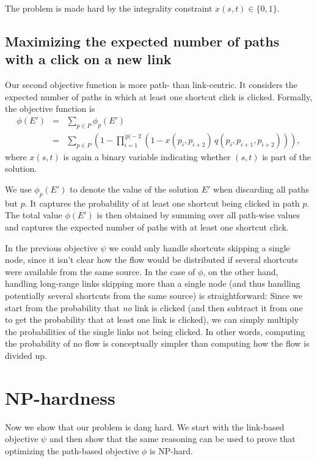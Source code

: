 \documentclass[11pt,letterpaper]{article}
\begin{document}
The problem is made hard by the integrality constraint $x(s,t) \in \{0,1\}$.




\subsection{Maximizing the expected number of paths with a click on a new link}

Our second objective function is more path- than link-centric.
It considers the expected number of paths in which at least one shortcut click is clicked.
Formally, the objective function is
\begin{eqnarray}
\phi(E')  &=& \sum_{p \in P} \phi_p(E') \\
          &=& \sum_{p \in P} \left( 1 - \prod_{i=1}^{|p|-2} \left( 1 - x(p_i,p_{i+2}) \, q(p_i,p_{i+1},p_{i+2}) \right) \right),
\end{eqnarray}
where $x(s,t)$ is again a binary variable indicating whether $(s,t)$ is part of the solution.

We use $\phi_p(E')$ to denote the value of the solution $E'$ when discarding all paths but $p$.
It captures the probability of at least one shortcut being clicked in path $p$.
The total value $\phi(E')$ is then obtained by summing over all path-wise values and captures the expected number of paths with at least one shortcut click.

In the previous objective $\psi$ we could only handle shortcuts skipping a single node, since it isn't clear how the flow would be distributed if several shortcuts were available from the same source.
In the case of $\phi$, on the other hand, handling long-range links skipping more than a single node (and thus handling potentially several shortcuts from the same source) is straightforward:
Since we start from the probability that {\em no} link is clicked (and then subtract it from one to get the probability that at least one link is clicked), we can simply multiply the probabilities of the single links not being clicked.
In other words, computing the probability of no flow is conceptually simpler than computing how the flow is divided up.




\section{NP-hardness}

Now we show that our problem is dang hard.
We start with the link-based objective $\psi$ and then show that the same reasoning can be used to prove that optimizing the path-based objective $\phi$ is NP-hard.
\end{document}

